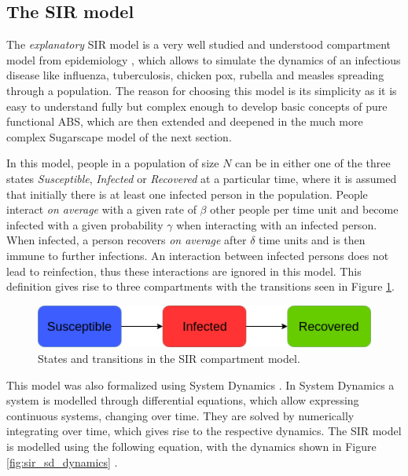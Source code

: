 \subsection{The SIR model}
\label{sec:sir_model}

The \textit{explanatory} SIR model is a very well studied and understood compartment model from epidemiology \cite{kermack_contribution_1927}, which allows to simulate the dynamics of an infectious disease like influenza, tuberculosis, chicken pox, rubella and measles spreading through a population. The reason for choosing this model is its simplicity as it is easy to understand fully but complex enough to develop basic concepts of pure functional ABS, which are then extended and deepened in the much more complex Sugarscape model of the next section.

In this model, people in a population of size $N$ can be in either one of the three states \textit{Susceptible}, \textit{Infected} or \textit{Recovered} at a particular time, where it is assumed that initially there is at least one infected person in the population. People interact \textit{on average} with a given rate of $\beta$ other people per time unit and become infected with a given probability $\gamma$ when interacting with an infected person. When infected, a person recovers \textit{on average} after $\delta$ time units and is then immune to further infections. An interaction between infected persons does not lead to reinfection, thus these interactions are ignored in this model. This definition gives rise to three compartments with the transitions seen in Figure \ref{fig:sir_transitions}.

\begin{figure}
	\centering
	\includegraphics[width=.7\textwidth, angle=0]{./fig/timedriven/SIR_transitions.png}
	\caption[States and transitions in the SIR compartment model]{States and transitions in the SIR compartment model.}
	\label{fig:sir_transitions}
\end{figure}

This model was also formalized using System Dynamics \cite{porter_industrial_1962}. In System Dynamics a system is modelled through differential equations, which allow expressing continuous systems, changing over time. They are solved by numerically integrating over time, which gives rise to the respective dynamics. The SIR model is modelled using the following equation, with the dynamics shown in Figure \ref{fig:sir_sd_dynamics} .

